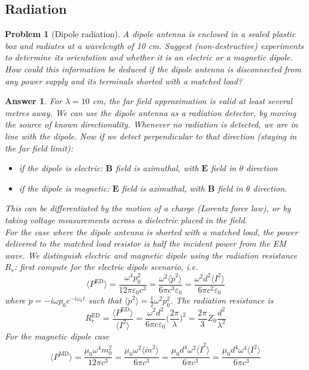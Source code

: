 \documentclass[a4paper]{article}
\newtheorem{ans}{Answer}
\theoremstyle{new}
\newtheorem{qns}{Problem}
\begin{document}
\subsection*{Radiation}
\begin{qns}[Dipole radiation]
A dipole antenna is enclosed in a sealed plastic box and radiates at a wavelength of 10 cm. Suggest (non-destructive) experiments to determine its orientation and whether it is an electric or a magnetic dipole.\\[5pt]
How could this information be deduced if the dipole antenna is disconnected from any power supply and its terminals shorted with a matched load?
\end{qns}
\begin{ans}
For $\lambda=10$ cm, the far field approximation is valid at least several metres away. We can use the dipole antenna as a radiation detector, by moving the source of known directionality. Whenever no radiation is detected, we are in line with the dipole. Now if we detect perpendicular to that direction (staying in the far field limit):
\begin{itemize}
    \item if the dipole is electric: $\mathbf{B}$ field is azimuthal, with $\mathbf{E}$ field in $\theta$ direction
    \item if the dipole is magnetic: $\mathbf{E}$ field is azimuthal, with $\mathbf{B}$ field in $\theta$ direction.
\end{itemize}
This can be differentiated by the motion of a charge (Lorentz force law), or by taking voltage measurements across a dielectric placed in the field.\\[5pt]
For the case where the dipole antenna is shorted with a matched load, the power delivered to the matched load resistor is half the incident power from the EM wave. We distinguish electric and magnetic dipole using the radiation resistance $R_r$: first compute for the electric dipole scenario, i.e.
$$\langle P^{\text{ED}}\rangle=\frac{\omega^4p_0^2}{12\pi\varepsilon_0c^3}=\frac{\omega^2\langle\dot{p}^2\rangle}{6\pi c^3\varepsilon_0}=\frac{\omega^2d^2\langle I^2\rangle}{6\pi c^2\varepsilon_0}$$
where $\dot{p}=-i\omega p_0e^{-i\omega_0t}$ such that $\langle\dot{p}^2\rangle=\frac{1}{2}\omega^2p_0^2$. The radiation resistance is
$$R_r^{\text{ED}}=\frac{\langle P^{\text{ED}}\rangle}{\langle I^2\rangle}=\frac{\omega^2d^2}{6\pi c\varepsilon_0}\bigg(\frac{2\pi}{\lambda}\bigg)^2=\frac{2\pi}{3}Z_0\frac{d^2}{\lambda^2}$$
For the magnetic dipole case
$$\langle P^{\text{MD}}\rangle=\frac{\mu_0\omega^4m_0^2}{12\pi c^3}=\frac{\mu_0\omega^2\langle\dot{m}^2\rangle}{6\pi c^3}=\frac{\mu_0d^4\omega^2\langle\dot{I}^2\rangle}{6\pi c^3}=\frac{\mu_0d^4\omega^4\langle I^2\rangle}{6\pi c^3}$$

\end{ans}
\end{document}
